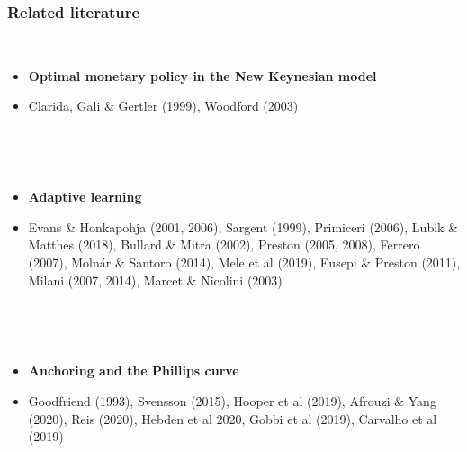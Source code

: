 \documentclass[10pt]{beamer}
\begin{document}
\begin{frame}
	\frametitle{Related literature}

\

\begin{itemize}
\item \textbf{Optimal monetary policy in the New Keynesian model}
\item[] Clarida, Gali \& Gertler (1999), Woodford (2003)

\

\

\item \textbf{Adaptive learning}
\item[] Evans \& Honkapohja (2001, 2006), Sargent (1999), Primiceri (2006), Lubik \& Matthes (2018), Bullard \& Mitra (2002), Preston (2005, 2008), Ferrero (2007), Moln\'ar \& Santoro (2014), Mele et al (2019), Eusepi \& Preston (2011), Milani (2007, 2014), Marcet \& Nicolini (2003)

\

\

\item \textbf{Anchoring and the Phillips curve} 
\item[] Goodfriend (1993), Svensson (2015), Hooper et al (2019), Afrouzi \& Yang (2020), Reis (2020), Hebden et al 2020, Gobbi et al (2019), Carvalho et al (2019)

%
%
\end{itemize}


\end{frame}

%
%
%
%
%
%
%
%
%
%
%
%
%
%
%
\end{document}
